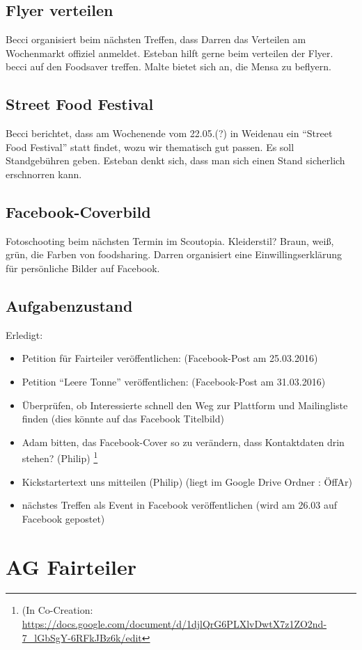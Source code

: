 \documentclass{scrreprt}
\begin{document}
\subsection{Flyer verteilen}
Becci organisiert beim nächsten Treffen, dass Darren das Verteilen am Wochenmarkt offiziel anmeldet. Esteban hilft gerne beim verteilen der Flyer. becci auf den Foodsaver treffen. Malte bietet sich an, die Mensa zu beflyern.
\subsection{Street Food Festival}
Becci berichtet, dass am Wochenende vom 22.05.(?) in Weidenau ein \enquote{Street Food Festival} statt findet, wozu wir thematisch gut passen. Es soll Standgebühren geben. Esteban denkt sich, dass man sich einen Stand sicherlich erschnorren kann. 
\subsection{Facebook-Coverbild}
Fotoschooting beim nächsten Termin im Scoutopia. Kleiderstil? Braun, weiß, grün, die Farben von foodsharing. Darren organisiert eine Einwillingserklärung für persönliche Bilder auf Facebook.
\subsection{Aufgabenzustand}
Erledigt:
\begin{itemize}
\item Petition für Fairteiler veröffentlichen:  (Facebook-Post am 25.03.2016)
\item Petition \enquote{Leere Tonne} veröffentlichen: (Facebook-Post am 31.03.2016)
\item  Überprüfen, ob Interessierte schnell den Weg zur Plattform und Mailingliste finden (dies könnte auf das Facebook Titelbild)
\item Adam bitten, das Facebook-Cover so zu verändern, dass Kontaktdaten drin stehen? (Philip) \footnote{(In Co-Creation: \url{https://docs.google.com/document/d/1djlQrG6PLXlvDwtX7z1ZO2nd-7_lGbSgY-6RFkJBz6k/edit}}
\item Kickstartertext uns mitteilen (Philip) (liegt im Google Drive Ordner : ÖffAr)
\item nächstes Treffen als Event in Facebook veröffentlichen (wird am 26.03 auf Facebook gepostet)
\end{itemize}
\section{AG Fairteiler}
\end{document}
